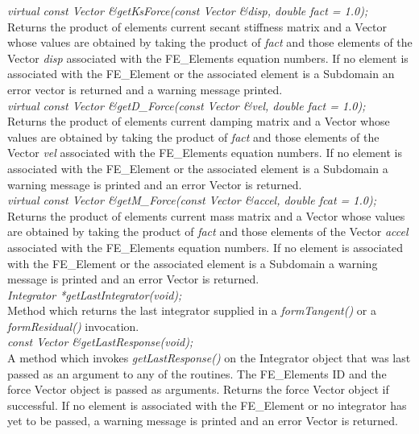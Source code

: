 {\em virtual const Vector \&getKsForce(const Vector \&disp, double
fact = 1.0);    }\\
Returns the product of elements current secant stiffness matrix
and a Vector whose values are obtained by taking the product of {\em
fact} and those elements of the Vector {\em disp} associated with 
the FE\_Elements equation numbers. If no element is associated with the
FE\_Element or the associated element is a Subdomain an error vector
is returned and a warning message printed. \\


{\em virtual const Vector \&getD\_Force(const Vector \&vel, double
fact = 1.0); }\\
Returns the product of elements current damping matrix
and a Vector whose values are obtained by taking the product of {\em
fact} and those elements of the Vector {\em vel} associated with 
the FE\_Elements equation numbers. If no element is associated with the
FE\_Element or the associated element is a Subdomain a warning message
is printed and an error Vector is returned. \\

{\em virtual const Vector \&getM\_Force(const Vector \&accel, double
fcat = 1.0);}\\
Returns the product of elements current mass matrix
and a Vector whose values are obtained by taking the product of {\em
fact} and those elements of the Vector {\em accel} associated with 
the FE\_Elements equation numbers. If no element is associated with the
FE\_Element or the associated element is a Subdomain a warning message
is printed and an error Vector is returned. \\

{\em Integrator *getLastIntegrator(void);} \\
Method which returns the last integrator supplied in a {\em
formTangent()} or a {\em formResidual()}  invocation. \\

{\em const Vector \&getLastResponse(void);} \\
A method which invokes {\em getLastResponse()} on the Integrator
object that was last passed as an argument to any of the routines.
The FE\_Elements ID and the force Vector object is passed as arguments.
Returns the force Vector object if successful. If no element is
associated with the FE\_Element or no integrator has yet to be passed,
a warning message is printed and an error Vector is returned. \\


